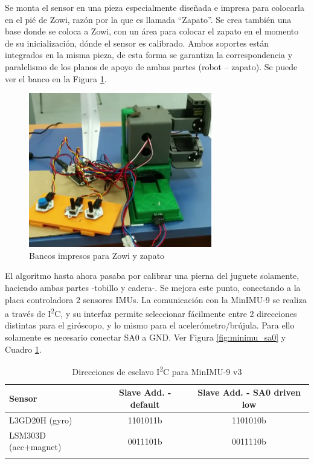 Se monta el sensor en una pieza especialmente diseñada e impresa para colocarla en el pié de Zowi, razón por la que es llamada ``Zapato''.
Se crea también una base donde se coloca a Zowi, con un área para colocar el zapato en el momento de su inicialización, dónde el sensor es calibrado. Ambos soportes están integrados en la misma pieza, de esta forma se garantiza la correspondencia y paralelismo de los planos de apoyo de ambas partes (robot – zapato). Se puede ver el banco en la Figura \ref{fig:banco_1zapato}.


\begin{figure}[h]
\centering
\includegraphics[width=80mm]{Figures/banco_1zapato}
\caption[Bancos impresos para Zowi y zapato]{Bancos impresos para Zowi y zapato}
\label{fig:banco_1zapato}
\end{figure}

El algoritmo hasta ahora pasaba por calibrar una pierna del juguete solamente, haciendo ambas partes -tobillo y cadera-. Se mejora este punto, conectando a la placa controladora 2 sensores IMUs. La comunicación con la MinIMU-9 se realiza a través de I\textsuperscript{2}C, y su interfaz permite seleccionar fácilmente entre 2 direcciones distintas para el giróscopo, y lo mismo para el acelerómetro/brújula. Para ello solamente es necesario conectar SA0 a GND. Ver Figura \ref{fig:minimu_sa0} y Cuadro \ref{tablei2c}.

\begin{table}[h]
\centering
\begin{tabular}{l c c}
\toprule
\textbf{Sensor} & \textbf{Slave Add. - default} & \textbf{Slave Add. - SA0 driven low} \\
\midrule
L3GD20H (gyro) & 1101011b & 1101010b \\
LSM303D (acc+magnet) & 0011101b & 0011110b \\
\bottomrule\\
\end{tabular}
\caption{Direcciones de esclavo I\textsuperscript{2}C para MinIMU-9 v3}
\label{tablei2c}
\end{table}


